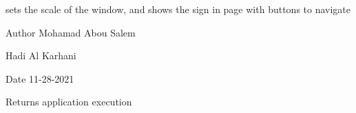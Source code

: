 sets the scale of the window, and shows the sign in page with buttons to navigate \begin{DoxyAuthor}{Author}
Mohamad Abou Salem 

Hadi Al Karhani 
\end{DoxyAuthor}
\begin{DoxyDate}{Date}
11-\/28-\/2021
\end{DoxyDate}
\begin{DoxyReturn}{Returns}
application execution 
\end{DoxyReturn}
